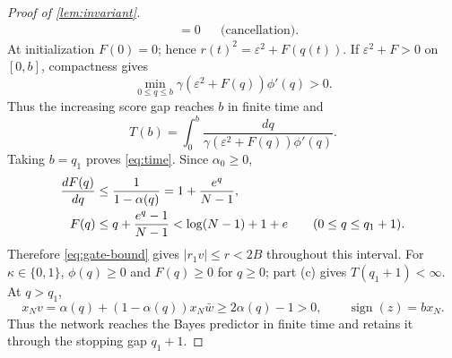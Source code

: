 \begin{proof}[Proof of \cref{lem:invariant}]
\begin{align*}
 &=0 &&\text{(cancellation)}.
\end{align*}
At initialization $F(0)=0$; hence $r(t)^2=\varepsilon^2+F(q(t))$.
If $\varepsilon^2+F>0$ on $[0,b]$, compactness gives
\[
 \min_{0\le q\le b}\gamma(\varepsilon^2+F(q))\phi'(q)>0.
\]
Thus the increasing score gap reaches $b$ in finite time and
\begin{equation}
 T(b)=\int_0^b\frac{dq}{\gamma(\varepsilon^2+F(q))\phi'(q)}.
 \label{eq:hitting-quadrature}
\end{equation}
Taking $b=q_1$ proves \cref{eq:time}.
Since $\alpha_0\ge0$,
\begin{align*}
 \frac{d F(q)}{d q}&\le\frac{1}{1-\alpha(q)}=1+\frac{e^q}{N-1},\\
 F(q)&\le q+\frac{e^q-1}{N-1}
 <\log(N-1)+1+e\qquad(0\le q\le q_1+1).
\end{align*}
Therefore \cref{eq:gate-bound} gives $|r_1v|\le r<2B$ throughout this interval.
For $\kappa\in\{0,1\}$, $\phi(q)\ge0$ and $F(q)\ge0$ for $q\ge0$; part (c) gives $T(q_1+1)<\infty$.
At $q>q_1$,
\[
 x_N v=\alpha(q)+(1-\alpha(q))x_N\bar w\ge2\alpha(q)-1>0,
 \qquad \operatorname{sign}(z)=b x_N.
\]
Thus the network reaches the Bayes predictor in finite time and retains it through the stopping gap $q_1+1$.\qedhere
\end{proof}
